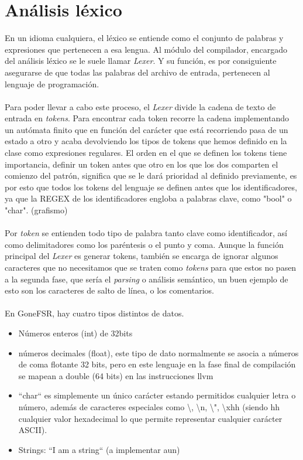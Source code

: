 \section{Análisis léxico}
En un idioma cualquiera,  el léxico se entiende como el conjunto de palabras y expresiones que pertenecen a esa lengua. Al módulo del compilador, encargado del análisis léxico se le suele llamar \textit{Lexer}. Y su función, es por consiguiente asegurarse de que todas las palabras del archivo de entrada, pertenecen al lenguaje de programación. \\\\
Para poder llevar a cabo este proceso, el \textit{Lexer} divide la cadena de texto de entrada en \textit{tokens}. Para encontrar cada token recorre la cadena implementando un autómata finito que en función del carácter que está recorriendo pasa de un estado a otro y acaba devolviendo los tipos de tokens que hemos definido en la clase como expresiones regulares. El orden en el que se definen los tokens tiene importancia, definir un token antes que otro en los que los dos comparten el comienzo del patrón, significa que se le dará prioridad al definido previamente, es por esto que todos los tokens del lenguaje se definen antes que los identificadores, ya que la REGEX de los identificadores engloba a palabras clave, como "bool" o "char". (grafismo)
\\\\
Por \textit{token} se entienden todo tipo de palabra tanto clave como identificador, así como delimitadores como los paréntesis o el punto y coma. Aunque la función principal del \textit{Lexer} es generar tokens, también se encarga de ignorar algunos caracteres que no necesitamos que se traten como \textit{tokens} para que estos no pasen a la segunda fase, que sería el \textit{parsing} o análisis semántico, un buen ejemplo de esto son los caracteres de salto de línea, o los comentarios.\\\\
En GoneFSR, hay cuatro tipos distintos de datos. 
\begin{itemize}
    \item{Números enteros (int) de 32bits}
    \item{números decimales (float), este tipo de dato normalmente se asocia a números de coma flotante 32 bits, pero en este lenguaje en la fase final de compilación se mapean a double (64 bits) en las instrucciones llvm}
    \item{``char``  es simplemente un único carácter estando permitidos cualquier letra o número, además de caracteres especiales como \textbackslash, \textbackslash n, \textbackslash ", \textbackslash xhh (siendo hh cualquier valor hexadecimal lo que permite representar cualquier carácter ASCII).}
    \item{Strings: ``I am a string`` (a implementar aun)}\\
\end{itemize}

